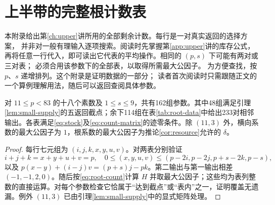 \chapter{上半带的完整根计数表}\label{app:certificates}

本附录给出第\ref{ch:upper}讲所用的全部剩余计数。每行是一对真实返回的选择方案，
并非对一般有理输入逐项搜索。阅读时先掌握第\ref{app:upper}讲的库存公式，
再将任意一行代入，即可读出它代表的平均操作。相同的 $(p,s)$ 下可能有两对或三对表；
必须合用该参数下的全部表，以取得所需最大公因子。
为方便查找，按 $p$、$s$ 递增排列。这个附录是证明数据的一部分；
读者首次阅读时只需跟随正文的一个算例理解用法，随后可以返回查阅具体参数。

\begin{proposition}[根计数证书]\label{prop:root-certificate}
对 $11\le p<83$ 的十八个素数及 $1\le s\le9$，共有162组参数。其中48组满足引理\ref{lem:small-supply}的五返回截点；余下114组在表\ref{tab:root-data}中给出233对相邻输出。各表满足\eqref{eq:stock}及\eqref{eq:count-matrix}的迹零条件。除 $(11,3)$ 外，横向系数的最大公因子为 $1$，根系数的最大公因子为推论\ref{cor:resource}允许的 $\delta$。
\end{proposition}
\begin{proof}
每行七元组为 $(i,j,k,x,y,u,v)$。对两表分别验证
\[
i+j+k=x+y+u+v=p,\quad
0\le(x,y,u,v)\le(p-2i,p-2j,p+s-2k,p-s),
\]
以及 $p(x-y)+(i-j)v=(p+s)j-pk$。第二输出与第一输出相差 $(-1,-1,2,0)$。随后按\eqref{eq:root-count}计算 $H$ 并取最大公因子；这些均为表列整数的直接运算。对每个参数检查它恰属于“达到截点”或“表内”之一，证明覆盖无遗漏。例外 $(11,3)$ 已由引理\ref{lem:small-supply}中的显式矩阵处理。
\end{proof}

